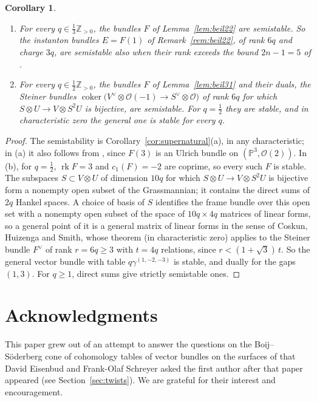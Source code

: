 \documentclass[11pt]{amsart}
\newtheorem{corollary}[theorem]{Corollary}
\theoremstyle{definition}
\theoremstyle{remark}
\newcommand{\PP}{\mathbb{P}}
\newcommand{\ZZ}{\mathbb{Z}}
\newcommand{\OO}{\mathcal{O}}
\DeclareMathOperator{\rk}{rk}
\DeclareMathOperator{\coker}{coker}
\begin{document}
\begin{corollary}\label{cor:appP3}
\begin{enumerate}[label=\textup{(\alph*)}]
\item For every $q\in\frac13\ZZ_{>0}$, the bundles $F$ of Lemma~\ref{lem:beil22} are semistable. So the instanton bundles $E=F(1)$ of Remark~\ref{rem:beil22}, of rank $6q$ and charge $3q$, are semistable also when their rank exceeds the bound $2n-1=5$ of \cite{Ja06}.
\item For every $q\in\frac12\ZZ_{>0}$, the bundles $F$ of Lemma~\ref{lem:beil31} and their duals, the Steiner bundles $\coker\big(V^\vee\otimes\OO(-1)\to S^\vee\otimes\OO\big)$ of rank $6q$ for which $S\otimes U\to V\otimes S^2U$ is bijective, are semistable. For $q=\frac12$ they are stable, and in characteristic zero the general one is stable for every $q$.
\end{enumerate}
\end{corollary}

\begin{proof}
The semistability is Corollary~\ref{cor:supernatural}(a), in any characteristic; in (a) it also follows from \cite[Thm.~2.9]{CH12}, since $F(3)$ is an Ulrich bundle on $(\PP^3,\OO(2))$. In (b), for $q=\frac12$, $\rk F=3$ and $c_1(F)=-2$ are coprime, so every such $F$ is stable. The subspaces $S\subset V\otimes U$ of dimension $10q$ for which $S\otimes U\to V\otimes S^2U$ is bijective form a nonempty open subset of the Grassmannian; it contains the direct sums of $2q$ Hankel spaces. A choice of basis of $S$ identifies the frame bundle over this open set with a nonempty open subset of the space of $10q\times4q$ matrices of linear forms, so a general point of it is a general matrix of linear forms in the sense of Coskun, Huizenga and Smith, whose theorem \cite[Thm.~5.4]{CHS} (in characteristic zero) applies to the Steiner bundle $F^\vee$ of rank $r=6q\ge3$ with $t=4q$ relations, since $r<(1+\sqrt3)\,t$. So the general vector bundle with table $q\gamma^{(1,-2,-3)}$ is stable, and dually for the gaps $(1,3)$. For $q\ge1$, direct sums give strictly semistable ones.
\end{proof}

\section*{Acknowledgments}
This paper grew out of an attempt to answer the questions on the Boij--Söderberg cone of cohomology tables of vector bundles on the surfaces of \cite{An1} that David Eisenbud and Frank-Olaf Schreyer asked the first author after that paper appeared (see Section~\ref{sec:twists}). We are grateful for their interest and encouragement.
\end{document}
